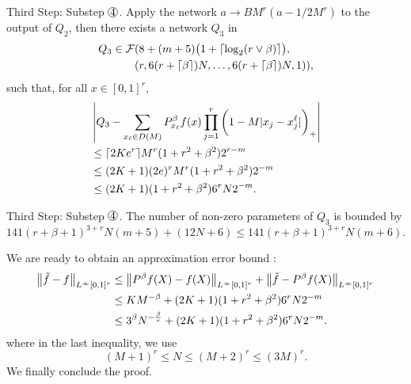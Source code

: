 \documentclass{if-beamer}
\DeclarePairedDelimiter{\ceil}{\lceil}{\rceil}
\newcommand*\circled[1]{\tikz[baseline=(char.base)]{
            \node[shape=circle,draw,inner sep=0.2pt] (char) {#1};}}
\begin{document}
\begin{frame}{Third Step: Substep $\circled{4}$.}
Apply the network $a\rightarrow{BM^{r}(a-1/2M^{r})}$ to the output of $Q_{2}$, then there exists a network $Q_{3}$ in 
    \begin{align*}
        Q_{3} \in \mathcal{F}&(8+(m+5) \big( 1 + \ceil{\log_{2}(r \vee \beta)} \big),\\
            &(r,6(r+\ceil{\beta})N,\dots,6(r+\ceil{\beta})N,1)),
    \end{align*}
such that, for all $x\in[0,1]^{r}$,
\begin{align*}
    &\left| Q_{3} -\sum_{x_{\ell}\in D(M)} P_{x_{\ell}}^{\beta}f(x)\prod_{j=1}^{r}\bigg( 1 - M|x_{j}-x_{j}^{\ell}| \bigg)_{+} \right| \\
    &\leq \ceil{2Ke^{r}}M^{r}(1+r^{2}+\beta^{2}) 2^{r-m} \\
    &\leq (2K+1)(2e)^{r}M^{r}(1+r^{2}+\beta^{2}) 2^{-m} \\
    &\leq (2K+1)(1+r^{2}+\beta^{2}) 6^{r} N 2^{-m}.
\end{align*}

\end{frame}

\begin{frame}{Third Step: Substep $\circled{4}$.}
    The number of non-zero parameters of $Q_{3}$ is bounded by
    \begin{equation*}
        141(r+\beta+1)^{3+r}N(m+5) + (12N+6)
        \leq 141(r+\beta+1)^{3+r}N(m+6).
    \end{equation*}

    We are ready to obtain an approximation error bound : 
    \begin{align*}
        \left\| \Tilde{f} - f \right\|_{L^\infty[0,1]^{r}}
        &\leq \left\| P^{\beta}f(X) - f(X) \right\|_{L^\infty[0,1]^{r}} +
        \left\| \Tilde{f} - P^{\beta}f(X) \right\|_{L^\infty[0,1]^{r}} \\
        &\leq KM^{-\beta} + (2K+1)(1+r^{2}+\beta^{2}) 6^{r} N 2^{-m} \\
        &\leq 3^\beta N^{-\frac{\beta}{r}} + (2K+1)(1+r^{2}+\beta^{2}) 6^{r} N 2^{-m}.
    \end{align*}
    where in the last inequality, we use 
    \begin{equation*}
        (M+1)^{r}\leq N \leq (M+2)^{r} \leq (3M)^{r}.
    \end{equation*}
    We finally conclude the proof.
\end{frame}

\end{document}
